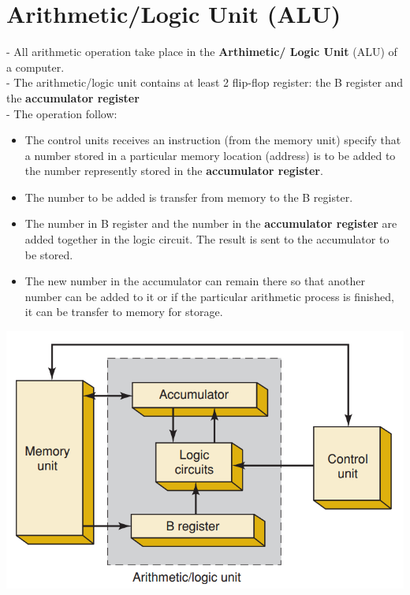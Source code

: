 \documentclass[12pt]{article}
\begin{document}
\section{Arithmetic/Logic Unit (ALU)}
- All arithmetic operation take place in the \textbf{Arthimetic/ Logic Unit} (ALU) of a computer. \\
- The arithmetic/logic unit contains at least 2 flip-flop register: the B register and the \textbf{accumulator register} \\
- The operation follow: \\
\begin{itemize}
	\item The control units receives an instruction (from the memory unit) specify that a number stored in a particular memory location (address) is to be added to the number represently stored in the \textbf{accumulator register}.
	\item The number to be added is transfer from memory to the B register.
	\item The number in B register and the number in the \textbf{accumulator register} are added together in the logic circuit. The result is sent to the accumulator to be stored.
	\item The new number in the accumulator can remain there so that another number can be added to it or if the particular arithmetic process is finished, it can be transfer to memory for storage.
\end{itemize}
\bigbreak
\includegraphics[scale = 0.6]{hinh36}
\end{document}
